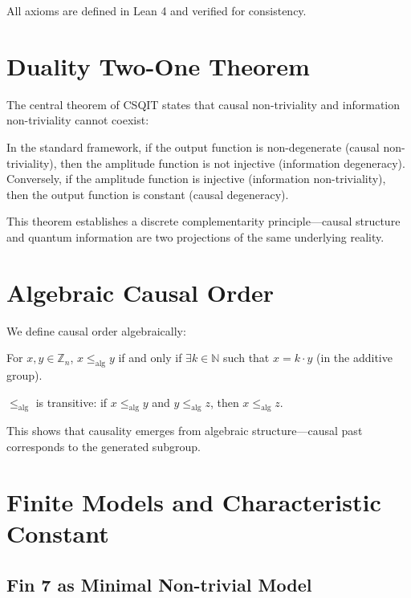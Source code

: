 \documentclass[aps,prd,twocolumn,nofootinbib,floatfix]{revtex4-2}
\begin{document}
All axioms are defined in Lean 4 and verified for consistency.

\section{Duality Two-One Theorem}

The central theorem of CSQIT states that causal non-triviality and information non-triviality cannot coexist:

\begin{theorem}
In the standard framework, if the output function is non-degenerate (causal non-triviality), then the amplitude function is not injective (information degeneracy). Conversely, if the amplitude function is injective (information non-triviality), then the output function is constant (causal degeneracy).
\end{theorem}

This theorem establishes a discrete complementarity principle---causal structure and quantum information are two projections of the same underlying reality.

\section{Algebraic Causal Order}

We define causal order algebraically:

\begin{definition}
For $x, y \in \mathbb{Z}_n$, $x \le_{\text{alg}} y$ if and only if $\exists k \in \mathbb{N}$ such that $x = k \cdot y$ (in the additive group).
\end{definition}

\begin{theorem}[Transitivity]
$\le_{\text{alg}}$ is transitive: if $x \le_{\text{alg}} y$ and $y \le_{\text{alg}} z$, then $x \le_{\text{alg}} z$.
\end{theorem}

This shows that causality emerges from algebraic structure---causal past corresponds to the generated subgroup.

\section{Finite Models and Characteristic Constant}

\subsection{Fin 7 as Minimal Non-trivial Model}
\end{document}
